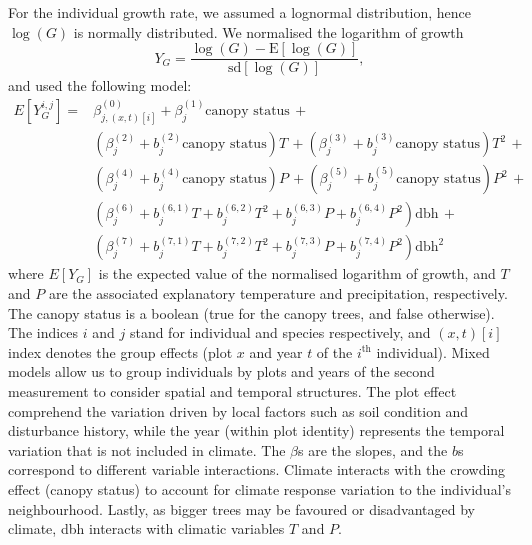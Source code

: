 For the individual growth rate, we assumed a lognormal distribution, hence $ \log(G) $ is normally distributed. We normalised the logarithm of growth
\[
	Y_{G} = \frac{\log(G) - \mathrm{E}[\log(G)]}{\mathrm{sd}[\log(G)]},
\]
and used the following model:
\begin{equation} \label{eq::glmm_growth}
\begin{split}
	E[Y_G^{i, j}] = & \beta_{j, (x, t)[i]}^{(0)}  + \beta_j^{(1)}  \text{canopy status} \, + \\
	& \left(\beta_j^{(2)} + b_j^{(2)} \text{canopy status} \right) T \, +
	\left(\beta_j^{(3)} + b_j^{(3)} \text{canopy status} \right) T^2 \, + \\
	& \left(\beta_j^{(4)} + b_j^{(4)} \text{canopy status} \right) P \, +
	\left(\beta_j^{(5)} + b_j^{(5)} \text{canopy status} \right) P^2 \, + \\
	& \left( \beta_j^{(6)} + b_j^{(6, 1)} T + b_j^{(6, 2)} T^2 +
		b_j^{(6, 3)} P + b_j^{(6, 4)} P^2 \right) \text{dbh} \, + \\
	& \left( \beta_j^{(7)} + b_j^{(7, 1)} T + b_j^{(7, 2)} T^2 +
		b_j^{(7, 3)} P + b_j^{(7, 4)} P^2 \right) \text{dbh}^2
\end{split}
\end{equation}
where $ E[Y_G] $ is the expected value of the normalised logarithm of growth, and $ T $ and $ P $ are the associated explanatory
temperature and precipitation, respectively. The canopy status is a boolean (true for the canopy
trees, and false otherwise). The indices $ i $ and $ j $ stand for individual and species respectively, and
$ (x, t)[i] $ index denotes the group effects (plot $ x $ and year $ t $ of
the $ i^{\text{th}} $ individual). Mixed models allow us to group individuals by plots and years of the second
measurement to consider spatial and temporal structures. The plot effect comprehend the variation
driven by local factors such as soil condition and disturbance history, while
the year (within plot identity) represents the temporal variation that is not
included in climate. The $ \beta $s are the slopes, and the $ b
$s correspond to different variable interactions. Climate interacts with the
crowding effect (canopy status) to account for climate response variation to
the individual's neighbourhood. Lastly, as bigger trees may be favoured or
disadvantaged by climate, dbh interacts with climatic variables $ T $ and $ P $. \\

